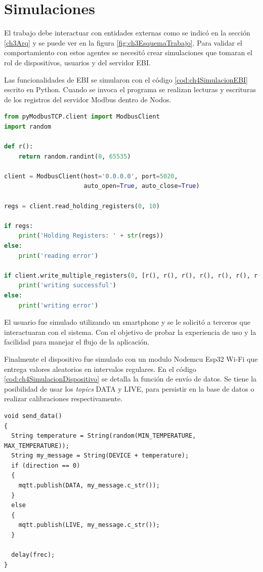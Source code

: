 \section{Simulaciones}
El trabajo debe interactuar con entidades externas como se indicó en la sección \ref{ch3Arq} y se puede ver en la figura \ref{fig:ch3EsquemaTrabajo}.
Para validar el comportamiento con estos agentes se necesitó crear simulaciones que tomaran el rol de dispositivos, usuarios y del servidor EBI.

Las funcionalidades de EBI se simularon con el código \ref{cod:ch4SimulacionEBI} escrito en Python.
Cuando se invoca el programa se realizan lecturas y escrituras de los registros del servidor Modbus dentro de Nodos.

\begin{lstlisting}[language=python,label=cod:ch4SimulacionEBI,caption=Simulación de EBI.]
from pyModbusTCP.client import ModbusClient
import random

def r():
    return random.randint(0, 65535)

client = ModbusClient(host='0.0.0.0', port=5020,
                      auto_open=True, auto_close=True)

regs = client.read_holding_registers(0, 10)

if regs:
    print('Holding Registers: ' + str(regs))
else:
    print('reading error')

if client.write_multiple_registers(0, [r(), r(), r(), r(), r(), r(), r(), r(), r(), r()]):
    print('writing successful')
else:
    print('writing error')
\end{lstlisting}

El usuario fue simulado utilizando un smartphone y se le solicitó a terceros que interactuaran con el sistema.
Con el objetivo de probar la experiencia de uso y la facilidad para manejar el flujo de la aplicación.

Finalmente el dispositivo fue simulado con un modulo Nodemcu Esp32 Wi-Fi que entrega valores aleatorios en intervalos regulares.
En el código \ref{cod:ch4SimulacionDispositivo} se detalla la función de envío de datos.
Se tiene la posibilidad de usar los \emph{topics} DATA y LIVE, para persistir en la base de datos o realizar calibraciones respectivamente.

\begin{lstlisting}[label=cod:ch4SimulacionDispositivo,caption=Función de envío de datos.]
void send_data()
{
  String temperature = String(random(MIN_TEMPERATURE, MAX_TEMPERATURE));
  String my_message = String(DEVICE + temperature);
  if (direction == 0)
  {
    mqtt.publish(DATA, my_message.c_str());
  }
  else
  {
    mqtt.publish(LIVE, my_message.c_str());
  }

  delay(frec);
}
\end{lstlisting}

